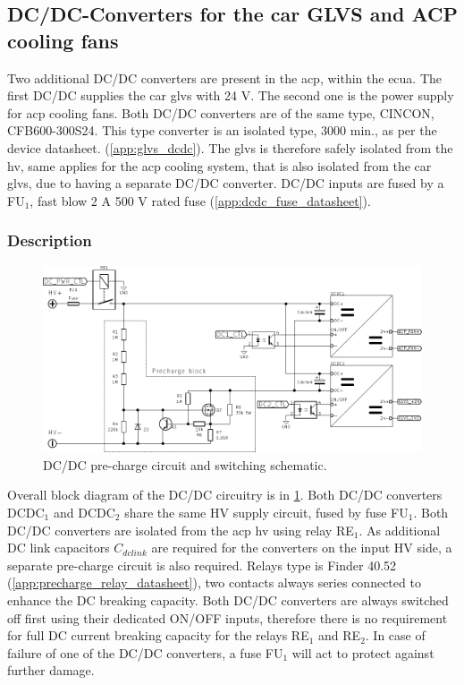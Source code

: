 \subsection {DC/DC-Converters for the car GLVS and ACP cooling fans}\label{subsec:glvs_dcdc}
Two additional DC/DC converters are present in the \gls{acp}, within the \gls{ecua}. The first DC/DC supplies the car \gls{glvs} with 24 V. The second one is the power supply for \gls{acp} cooling fans. Both DC/DC converters are of the same type, CINCON, CFB600-300S24. This type converter is an isolated type, 3000 \vac min., as per the device datasheet. (\ref{app:glvs_dcdc}). The \gls{glvs} is therefore safely isolated from the \gls{hv}, same applies for the \gls{acp} cooling system, that is also isolated from the car \gls{glvs}, due to having a separate DC/DC converter. DC/DC inputs are fused by a FU$_1$, fast blow 2 A 500 V rated fuse (\ref{app:dcdc_fuse_datasheet}).

\subsubsection{Description}

\begin{figure}[H]
	\centering
	\includegraphics[width=\textwidth,clip]{./img/ECUA_DCDC_PRECHARGE.pdf}
	\caption{DC/DC pre-charge circuit and switching schematic.}
	\label{fig:precharge_dcdc_sch}
\end{figure}

Overall block diagram of the DC/DC circuitry is in \ref{fig:precharge_dcdc_sch}. Both DC/DC converters DCDC$_1$ and DCDC$_2$ share the same HV supply circuit, fused by fuse FU$_1$. Both DC/DC converters are isolated from the \gls{acp} \gls{hv} using relay RE$_1$. As additional DC link capacitors $C_{dclink}$ are required for the converters on the input HV side, a separate pre-charge circuit is also required. 
Relays type is Finder 40.52 (\ref{app:precharge_relay_datasheet}), two contacts always series connected to enhance the DC breaking capacity. Both DC/DC converters are always switched off first using their dedicated ON/OFF inputs, therefore there is no requirement for full DC current breaking capacity for the relays RE$_1$ and RE$_2$. In case of failure of one of the DC/DC converters, a fuse FU$_1$ will act to protect against further damage. 

